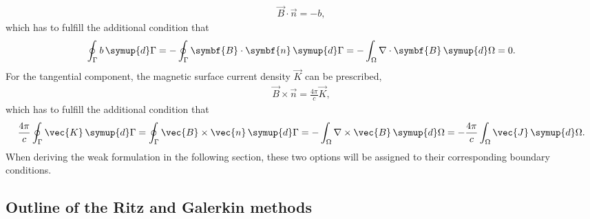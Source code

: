 \begin{gather*}
  \vec{B} \cdot \vec{n} = -b,
\end{gather*}
which has to fulfill the additional condition that
\begin{gather*}
  \oint_{\Gamma} b \, \symup{d} \Gamma = -\oint_{\Gamma} \symbf{B} \cdot \symbf{n} \, \symup{d} \Gamma = -\int_{\Omega} \nabla \cdot \symbf{B} \, \symup{d} \Omega = 0.
\end{gather*}
For the tangential component, the magnetic surface current density $\vec{K}$ can be prescribed,
\begin{gather*}
  \vec{B} \times \vec{n} = \frac{4 \pi}{c} \vec{K},
\end{gather*}
which has to fulfill the additional condition that
\begin{gather*}
  \frac{4 \pi}{c} \oint_{\Gamma} \vec{K} \, \symup{d} \Gamma = \oint_{\Gamma} \vec{B} \times \vec{n} \, \symup{d} \Gamma = -\int_{\Omega} \curl \vec{B} \, \symup{d} \Omega = -\frac{4 \pi}{c} \int_{\Omega} \vec{J} \, \symup{d} \Omega.
\end{gather*}
When deriving the weak formulation in the following section, these two options will be assigned to their corresponding boundary conditions.

\subsection{Outline of the Ritz and Galerkin methods}
\label{sec:ritz-galerkin}


